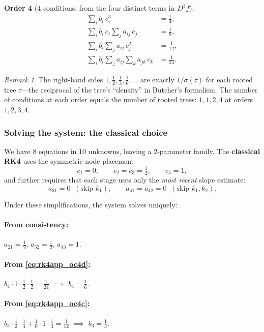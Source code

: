 \documentclass[12pt,a4paper]{article}
\theoremstyle{definition}
\theoremstyle{plain}
\theoremstyle{remark}
\newtheorem{remark}{Remark}[section]
\begin{document}
\noindent\textbf{Order 4} (4 conditions, from the four distinct terms in $D^3f$):
\begin{align}
  \sum_i b_i\, c_i^3 &= \frac{1}{4}, \label{eq:rk4app_oc4a}\\
  \sum_i b_i\, c_i \sum_j a_{ij}\, c_j &= \frac{1}{8}, \label{eq:rk4app_oc4b}\\
  \sum_i b_i \sum_j a_{ij}\, c_j^2 &= \frac{1}{12}, \label{eq:rk4app_oc4c}\\
  \sum_i b_i \sum_j a_{ij} \sum_k a_{jk}\, c_k &= \frac{1}{24}. \label{eq:rk4app_oc4d}
\end{align}

\begin{remark}
The right-hand sides $1, \tfrac{1}{2}, \tfrac{1}{3}, \tfrac{1}{6}, \ldots$ are exactly $1/\sigma(\tau)$ for each rooted tree $\tau$---the reciprocal of the tree's ``density'' in Butcher's formalism. The number of conditions at each order equals the number of rooted trees: $1, 1, 2, 4$ at orders $1,2,3,4$.
\end{remark}

\subsubsection{Solving the system: the classical choice}

We have 8 equations in 10 unknowns, leaving a 2-parameter family. The \textbf{classical RK4} uses the symmetric node placement
\[
  c_1 = 0, \qquad c_2 = c_3 = \tfrac{1}{2}, \qquad c_4 = 1,
\]
and further requires that each stage uses only the \emph{most recent} slope estimate:
\[
  a_{31} = 0 \;\;(\text{skip } k_1), \qquad a_{41} = a_{42} = 0 \;\;(\text{skip } k_1, k_2).
\]

Under these simplifications, the system solves uniquely:

\paragraph{From consistency:} $a_{21} = \tfrac{1}{2}$, $a_{32} = \tfrac{1}{2}$, $a_{43} = 1$.

\paragraph{From \eqref{eq:rk4app_oc4d}:} $b_4 \cdot 1 \cdot \tfrac{1}{2} \cdot \tfrac{1}{2} = \tfrac{1}{24}$ $\implies$ $b_4 = \tfrac{1}{6}$.

\paragraph{From \eqref{eq:rk4app_oc4c}:} $b_3 \cdot \tfrac{1}{2} \cdot \tfrac{1}{4} + \tfrac{1}{6}\cdot 1 \cdot \tfrac{1}{4} = \tfrac{1}{12}$ $\implies$ $b_3 = \tfrac{1}{3}$.
\end{document}
